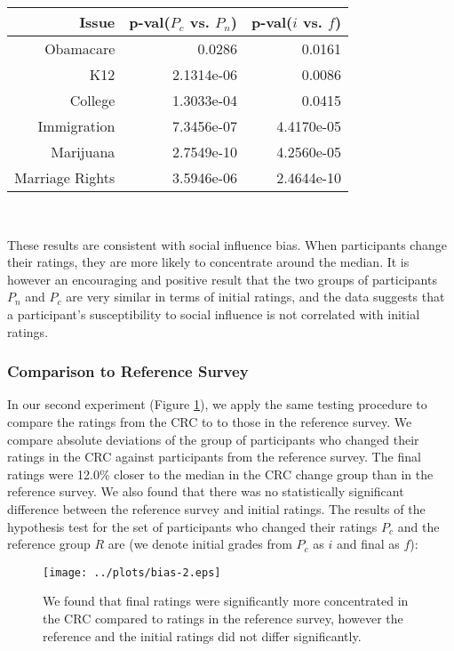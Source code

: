 {\centering
\scriptsize
\begin{tabular}[!ht] { r | r | r }
\label{dev-2}
  Issue & p-val($P_c$ vs. $P_n$) & p-val($i$ vs. $f$) \\
  \hline
  \hline
  Obamacare &  0.0286 & 0.0161 \\
  \hline
  K12 & 2.1314e-06 &  0.0086 \\
  \hline
  College & 1.3033e-04 & 0.0415 \\
  \hline
  Immigration & 7.3456e-07 &4.4170e-05\\
  \hline
  Marijuana & 2.7549e-10 & 4.2560e-05\\
  \hline
  Marriage Rights & 3.5946e-06 & 2.4644e-10 \\
\end{tabular}\\[1\baselineskip]
}

These results are consistent with social influence bias.
When participants change their ratings, they are more likely to concentrate around the median.
It is however an encouraging and positive result that the two groups of participants $P_n$ and $P_c$ are very similar in terms of initial ratings, and the data suggests that a participant's susceptibility to social influence is not correlated with initial ratings.

\subsubsection{Comparison to Reference Survey}
In our second experiment (Figure \ref{mdev-2}), we apply the same testing procedure to compare the ratings from the CRC to to those in the reference survey.
We compare absolute deviations of the group of participants who changed their ratings in the CRC against participants from the reference survey.
The final ratings were 12.0\% closer to the median in the CRC change group than in the reference survey.
We also found that there was no statistically significant difference between the reference survey and initial ratings.
The results of the hypothesis test for the set of participants who changed their ratings $P_c$ and the reference group $R$ are (we denote initial grades from $P_c$ as $i$ and final as $f$):
\begin{figure}[h]
\centering
    \texttt{[image: ../plots/bias-2.eps]}
      \caption{We found that final ratings were significantly more concentrated in the CRC compared to ratings in the reference survey, however the reference and the initial ratings did not differ significantly.}
      \label{mdev-2}
\end{figure}

